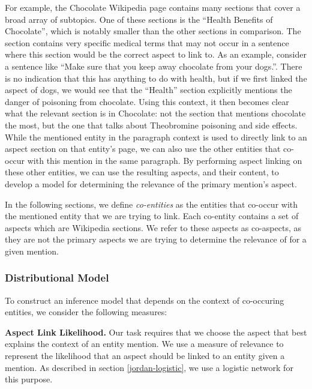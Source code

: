 \documentclass[sigconf,authordraft]{acmart}
\begin{document}
For example, the Chocolate Wikipedia page contains many sections that cover a broad array of subtopics. One of these sections is the ``Health Benefits of Chocolate'', which is notably smaller than the other sections in comparison. The section contains very specific medical terms that may not occur in a sentence where this section would be the correct aspect to link to. As an example, consider a sentence like ``Make sure that you keep away chocolate from your dogs.''. There is no indication that this has anything to do with health, but if we first linked the aspect of dogs, we would see that the ``Health'' section explicitly mentions the danger of poisoning from chocolate. Using this context, it then becomes clear what the relevant section is in Chocolate: not the section that mentions chocolate the most, but the one that talks about Theobromine poisoning and side effects.
While the mentioned entity in the paragraph context is used to directly link to an aspect section on that entity's page, we can also use the other entities that co-occur with this mention in the same paragraph. By performing aspect linking on these other entities, we can use the resulting aspects, and their content, to develop a model for determining the relevance of the primary mention's aspect.

In the following sections, we define \textit{co-entities} as the entities that co-occur with the mentioned entity that we are trying to link.
Each co-entity contains a set of aspects which are Wikipedia sections. 
We refer to these aspects as co-aspects, as they are not the primary aspects we are trying to determine the relevance of for a given mention.

\subsubsection{Distributional Model}
To construct an inference model that depends on the context of co-occuring entities, we consider the following measures:

\textbf{Aspect Link Likelihood.} Our task requires that we choose the aspect that best explains the context of an entity mention. We use a measure of relevance to represent the likelihood that an aspect should be linked to an entity given a mention. As described in section \ref{jordan-logistic}, we use a logistic network for this purpose. 
\end{document}
